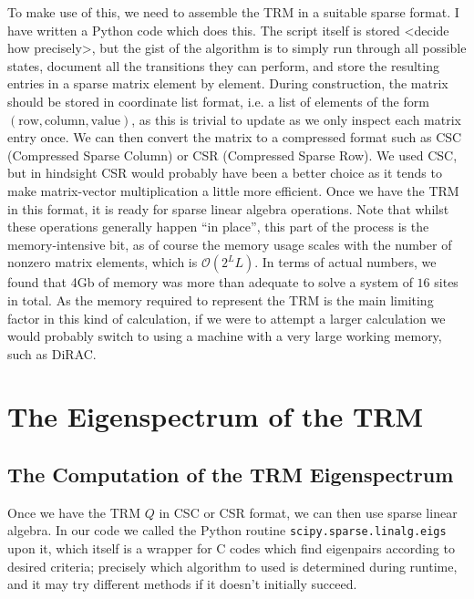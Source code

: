 To make use of this, we need to assemble the TRM in a suitable sparse format.
I have written a Python code which does this. The script itself is stored <decide how 
precisely>, but the gist of the algorithm is to simply run through all possible states,
document all the transitions they can perform, and store the resulting entries in
a sparse matrix element by element. During construction, the matrix should be stored in
coordinate list format, i.e. a list of elements of the form $(\mathrm{row}, 
\mathrm{column}, \mathrm{value})$, as this is trivial to update as we only inspect
each matrix entry once. We can then convert the matrix to a compressed format such
as CSC (Compressed Sparse Column) or CSR (Compressed Sparse Row). We used CSC, but in
hindsight CSR would probably have been a better choice as it tends to make
matrix-vector multiplication a little more efficient. Once we have the TRM in this
format, it is ready for sparse linear algebra operations. Note that whilst
these operations generally happen ``in place'', this part of the process is the
memory-intensive bit, as of course the memory usage scales with the number of nonzero
matrix elements, which is $\mathcal{O}(2^{L}L)$.
In terms of actual numbers, we found
that 4Gb of memory was more than adequate to solve a system of $16$ sites in total.
As the memory required to represent the TRM is the main limiting factor in this kind of
calculation, if we were to attempt a larger calculation we would probably switch to using a
machine with a very large working memory, such as DiRAC.

\section{The Eigenspectrum of the TRM}

\subsection{The Computation of the TRM Eigenspectrum} \label{sec:eigenFind}
Once we have the TRM $Q$ in CSC or CSR format, we can then use sparse linear algebra. 
In our code we called the Python routine \texttt{scipy.sparse.linalg.eigs} upon it,
which itself is a wrapper for C codes which find eigenpairs according to desired
criteria; precisely which algorithm to used is determined during runtime, and it may
try different methods if it doesn't initially succeed.


